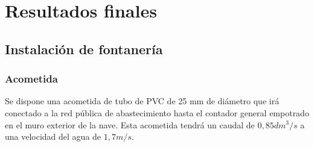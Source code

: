 \documentclass[../main.tex]{subfiles}
\begin{document}
\section{Resultados finales}

\subsection{Instalación de fontanería}
\subsubsection{Acometida}
Se dispone una acometida de tubo de PVC de 25 mm de diámetro que irá conectado a la red pública de abastecimiento hasta el contador general empotrado en el muro exterior de la nave. Esta acometida tendrá un caudal de $0,85 dm^3/s$ a una velocidad del agua de $1,7 m/s$.
\end{document}

